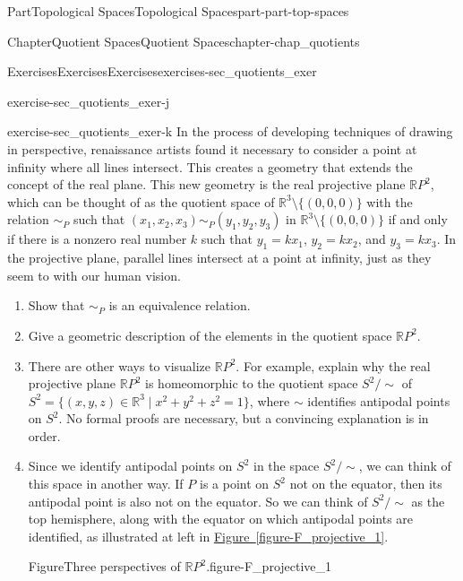 \documentclass[oneside,10pt,]{book}
\newcommand{\xreffont}{\relax}
\numberwithin{equation}{chapter}
\newcommand{\R}{\mathbb{R}}
\newcommand{\ssim}{\sim}
\begin{document}
\begin{partptx}{Part}{Topological Spaces}{}{Topological Spaces}{}{}{part-part-top-spaces}
\begin{chapterptx}{Chapter}{Quotient Spaces}{}{Quotient Spaces}{}{}{chapter-chap_quotients}
\begin{exercises-section}{Exercises}{Exercises}{}{Exercises}{}{}{exercises-sec_quotients_exer}
\begin{divisionexercise}{9}{}{}{exercise-sec_quotients_exer-j}
\begin{enumerate}[font=\bfseries,label=(\alph*),ref=\alph*]
\end{enumerate}%
\end{divisionexercise}%
\begin{divisionexercise}{10}{}{}{exercise-sec_quotients_exer-k}%
%
In the process of developing techniques of drawing in perspective, renaissance artists found it necessary to consider a point at infinity where all lines intersect. This creates a geometry that extends the concept of the real plane. This new geometry is the real projective plane \(\mathbb{R}P^2\), which can be thought of as the quotient space of \(\R^3 \setminus \{(0,0,0)\}\) with the relation \(\sim_P\) such that \((x_1,x_2,x_3) \sim_P (y_1,y_2,y_3)\) in \(\R^3 \setminus \{(0,0,0)\}\) if and only if there is a nonzero real number \(k\) such that \(y_1 = kx_1\), \(y_2 = kx_2\), and \(y_3 = kx_3\). In the projective plane, parallel lines intersect at a point at infinity, just as they seem to with our human vision.%
\begin{enumerate}[font=\bfseries,label=(\alph*),ref=\alph*]%
\item{}Show that \(\sim_P\) is an equivalence relation.%
\item{}Give a geometric description of the elements in the quotient space \(\mathbb{R}P^2\).%
\item{}There are other ways to visualize \(\mathbb{R}P^2\). For example, explain why the real projective plane \(\mathbb{R}P^2\) is homeomorphic to the quotient space \(S^2/\ssim\) of \(S^2 = \{(x,y,z) \in \R^3 \mid x^2+y^2+z^2 = 1\}\), where \(\sim\) identifies antipodal points on \(S^2\). No formal proofs are necessary, but a convincing explanation is in order.%
\item{}Since we identify antipodal points on \(S^2\) in the space \(S^2/\sim\), we can think of this space in another way. If \(P\) is a point on \(S^2\) not on the equator, then its antipodal point is also not on the equator. So we can think of \(S^2/\ssim\) as the top hemisphere, along with the equator on which antipodal points are identified, as illustrated at left in \hyperref[figure-F_projective_1]{Figure~{\xreffont\ref{figure-F_projective_1}}}.%
\begin{figureptx}{Figure}{Three perspectives of \(\mathbb{R}P^2\).}{figure-F_projective_1}{}%
\begin{sidebyside}{3}{0}{0}{0}%
\begin{sbspanel}{0.4}%

\end{sbspanel}
\end{sidebyside}
\end{figureptx}
\end{enumerate}
\end{divisionexercise}
\end{exercises-section}
\end{chapterptx}
\end{partptx}
\end{document}
